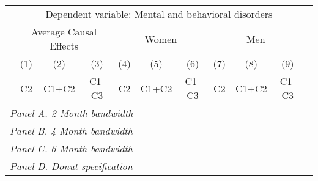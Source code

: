 {\def\sym#1{\ifmmode^{#1}\else\(^{#1}\)\fi}                 \begin{tabular}{l*{10}{c}} \toprule                 & \multicolumn{9}{c}{Dependent variable: Mental and behavioral disorders} \\ \cmidrule(lr){2-10}
            &\multicolumn{3}{c}{Average Causal Effects}&\multicolumn{3}{c}{Women}             &\multicolumn{3}{c}{Men}               \\\cmidrule(lr){2-4}\cmidrule(lr){5-7}\cmidrule(lr){8-10}
            &\multicolumn{1}{c}{(1)}&\multicolumn{1}{c}{(2)}&\multicolumn{1}{c}{(3)}&\multicolumn{1}{c}{(4)}&\multicolumn{1}{c}{(5)}&\multicolumn{1}{c}{(6)}&\multicolumn{1}{c}{(7)}&\multicolumn{1}{c}{(8)}&\multicolumn{1}{c}{(9)}\\
            &\multicolumn{1}{c}{C2}&\multicolumn{1}{c}{C1+C2}&\multicolumn{1}{c}{C1-C3}&\multicolumn{1}{c}{C2}&\multicolumn{1}{c}{C1+C2}&\multicolumn{1}{c}{C1-C3}&\multicolumn{1}{c}{C2}&\multicolumn{1}{c}{C1+C2}&\multicolumn{1}{c}{C1-C3}\\
\midrule
                 \multicolumn{10}{l}{\emph{Panel A. 2 Month bandwidth}} \\                                                                    \midrule\multicolumn{10}{l}{\emph{Panel B. 4 Month bandwidth}} \\                                                                    \midrule\multicolumn{10}{l}{\emph{Panel C. 6 Month bandwidth}} \\                                                                    \midrule\multicolumn{10}{l}{\emph{Panel D. Donut specification}} \\                                                                    
\bottomrule
\end{tabular}
}
